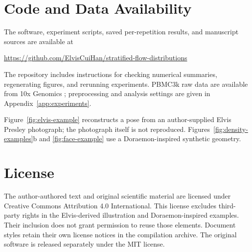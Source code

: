 \documentclass[10pt]{article}
\theoremstyle{definition}
\theoremstyle{plain}
\begin{document}
\clearpage
\section*{Code and Data Availability}
The software, experiment scripts, saved per-repetition results, and manuscript
sources are available at
\begin{center}
\url{https://github.com/ElvisCuiHan/stratified-flow-distributions}
\end{center}
The repository includes instructions for checking numerical summaries,
regenerating figures, and rerunning experiments. PBMC3k raw data are available
from 10x Genomics \citep{tenxgenomics2016pbmc3k}; preprocessing and analysis
settings are given in Appendix~\ref{app:experiments}.

Figure~\ref{fig:elvis-example} reconstructs a pose
from an author-supplied Elvis Presley photograph; the photograph itself is
not reproduced. Figures~\ref{fig:density-examples}b and
\ref{fig:face-example} use a Doraemon-inspired synthetic geometry.

\section*{License}
The author-authored text and original scientific material are licensed under
Creative Commons Attribution 4.0 International. This license excludes
third-party rights in the Elvis-derived illustration and Doraemon-inspired
examples. Their inclusion does not grant permission to reuse those elements.
Document styles retain their own license notices in the compilation archive.
The original software is released separately under the MIT license.
\label{maintext:end}
\clearpage

\clearpage
\appendix

\end{document}
